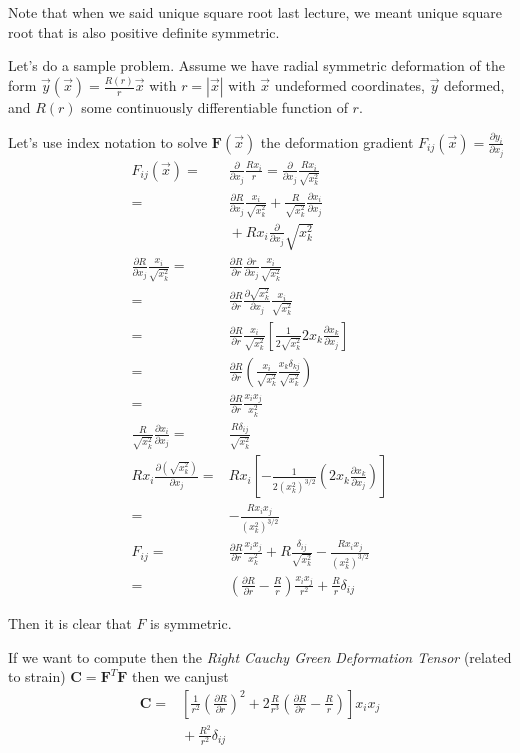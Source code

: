 \documentclass[10pt]{report}
\newcommand{\pd}[2]{\frac{\partial #1}{\partial#2}}
\newcommand{\abs}[1]{\left|#1\right|}
\begin{document}
Note that when we said unique square root last lecture, we meant unique square root that is also positive definite symmetric. 

Let's do a sample problem. Assume we have radial symmetric deformation of the form $\vec{y}(\vec{x}) = \frac{R(r)}{r}\vec{x}$ with $r = \abs{\vec{x}}$ with $\vec{x}$ undeformed coordinates, $\vec{y}$ deformed, and $R(r)$ some continuously differentiable function of $r$. 

Let's use index notation to solve $\mathbf{F}(\vec{x})$ the deformation gradient $F_{ij}(\vec{x}) = \pd{y_i}{x_j}$
\begin{align}
    F_{ij}(\vec{x}) =& \pd{}{x_j}\frac{R x_i}{r} = \pd{}{x_j} \frac{R x_i}{\sqrt{x_k^2}}\\
    =& \pd{R}{x_j}\frac{x_i}{\sqrt{x_k^2}} + \frac{R}{\sqrt{x_k^2}}\pd{x_i}{x_j}\nonumber \\
    &{}+ Rx_i\pd{}{x_j}\sqrt{x_k^2}\\
    \pd{R}{x_j}\frac{x_i}{\sqrt{x_k^2}} =& \pd{R}{r}\pd{r}{x_j}\frac{x_i}{\sqrt{x_k^2}} \\
    =& \pd{R}{r} \pd{\sqrt{x_k^2}}{x_j}\frac{x_i}{\sqrt{x_k^2}}\\
    =& \pd{R}{r}\frac{x_i}{\sqrt{x_k^2}}\left[ \frac{1}{2\sqrt{x_k^2}}2x_k \pd{x_k}{x_j} \right]\\
    =& \pd{R}{r}\left( \frac{x_i}{\sqrt{x_k^2}}\frac{x_k \delta_{kj}}{\sqrt{x_k^2}} \right)\\
    =& \pd{R}{r}\frac{x_i x_j}{x_k^2}\\
    \frac{R}{\sqrt{x_k^2}}\pd{x_i}{x_j} =& \frac{R\delta_{ij}}{\sqrt{x_k^2}}\\
    Rx_i \pd{\left( \sqrt{x_k^2} \right) }{x_j}=& Rx_i \left[ -\frac{1}{2(x_k^2)^{3/2}} \left(2x_k \pd{x_k}{x_j}\right) \right]\\
    =& -\frac{Rx_ix_j}{(x_k^2)^{3/2}}\\
    F_{ij} =& \pd{R}{r}\frac{x_ix_j}{x_k^2} + R\frac{\delta_{ij}}{\sqrt{x_k^2}} - \frac{Rx_ix_j}{(x_k^2)^{3/2}}\\
    =& \left( \pd{R}{r} - \frac{R}{r} \right)\frac{x_ix_j}{r^2} + \frac{R}{r}\delta_{ij}
\end{align}

Then it is clear that $F$ is symmetric. 

If we want to compute then the \emph{Right Cauchy Green Deformation Tensor} (related to strain) $\mathbf{C} = \mathbf{F}^T \mathbf{F}$ then we canjust
\begin{align}
    \mathbf{C} =& \left[ \frac{1}{r^2}\left( \pd{R}{r} \right)^2 + 2\frac{R}{r^3}\left( \pd{R}{r} - \frac{R}{r} \right) \right]x_ix_j\nonumber\\
    &{}+ \frac{R^2}{r^2}\delta_{ij}
\end{align}
\end{document}
